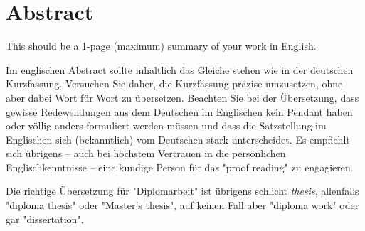 \chapter*{Abstract}

\begin{english} %
This should be a 1-page (maximum) summary of your work in English.
\end{english}

Im englischen Abstract sollte inhaltlich das Gleiche
stehen wie in der deutschen Kurzfassung. Versuchen Sie daher, die
Kurzfassung prä\-zise umzusetzen, ohne aber dabei Wort für Wort zu
übersetzen. Beachten Sie bei der Übersetzung, dass gewisse
Redewendungen aus dem Deutschen im Englischen kein Pendant haben
oder völlig anders formuliert werden müssen und dass die
Satzstellung im Englischen sich (bekanntlich) vom Deutschen stark
unterscheidet. Es
empfiehlt sich übrigens -- auch bei höchstem Vertrauen in die
persönlichen Englischkenntnisse -- eine kundige Person für das
"proof reading" zu engagieren.

Die richtige Übersetzung für "Diplomarbeit" ist übrigens
schlicht \emph{thesis}, allenfalls  "diploma thesis" oder "Master's thesis", 
auf keinen Fall aber "diploma work" oder gar "dissertation".

